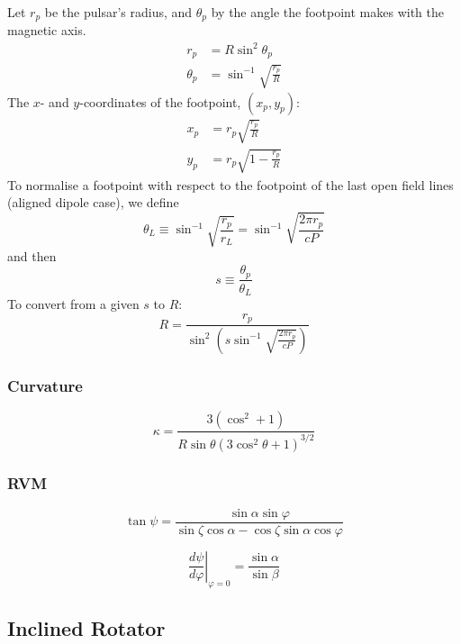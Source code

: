 \documentclass{article}
\newcommand{\phase}{\varphi}
\begin{document}
Let $r_p$ be the pulsar's radius, and $\theta_p$ by the angle the footpoint makes with the magnetic axis.
\begin{align}
    r_p &= R\sin^2\theta_p \\
    \theta_p &= \sin^{-1}\sqrt{\frac{r_p}{R}}
\end{align}
The $x$- and $y$-coordinates of the footpoint, $(x_p,y_p)$:
\begin{align}
    x_p &= r_p\sqrt{\frac{r_p}{R}} \\
    y_p &= r_p \sqrt{1 - \frac{r_p}{R}}
\end{align}
To normalise a footpoint with respect to the footpoint of the last open field lines (aligned dipole case), we define
\begin{equation}
    \theta_L \equiv \sin^{-1}\sqrt{\frac{r_p}{r_L}}
             =      \sin^{-1}\sqrt{\frac{2\pi r_p}{cP}}
\end{equation}
and then
\begin{equation}
    s \equiv \frac{\theta_p}{\theta_L}
\end{equation}
To convert from a given $s$ to $R$:
\begin{equation}
    R = \frac{r_p}{\sin^2\left(s\sin^{-1}\sqrt{\frac{2\pi r_p}{cP}}\right)}
\end{equation}

\subsubsection{Curvature}

\begin{equation}
    \kappa = \frac{3(\cos^2 + 1)}{R\sin\theta(3\cos^2\theta + 1)^{3/2}}
\end{equation}

\subsubsection{RVM}

\begin{equation}
    \tan{\psi} = \frac{\sin\alpha \sin\phase}{\sin\zeta\cos\alpha - \cos\zeta\sin\alpha\cos\phase}
\end{equation}

\begin{equation}
    \left.\frac{d\psi}{d\phase}\right|_{\phase=0} = \frac{\sin\alpha}{\sin\beta}
\end{equation}

\subsection{Inclined Rotator}
\end{document}
